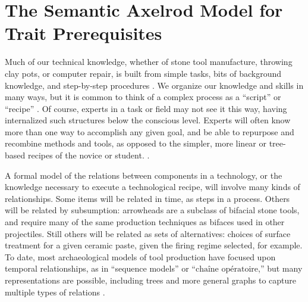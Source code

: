 \documentclass[referee,graybox,natbib]{svmult}
\begin{document}
\section{The Semantic Axelrod Model for Trait
Prerequisites}\label{the-semantic-axelrod-model-for-trait-prerequisites}

Much of our technical knowledge, whether of stone tool manufacture,
throwing clay pots, or computer repair, is built from simple tasks, bits
of background knowledge, and step-by-step procedures
\citep{neff1992ceramics, schiffer1987theory}. We organize our knowledge
and skills in many ways, but it is common to think of a complex process
as a ``script'' or ``recipe'' \citep{schank1977scripts}. Of course,
experts in a task or field may not see it this way, having internalized
such structures below the conscious level. Experts will often know more
than one way to accomplish any given goal, and be able to repurpose and
recombine methods and tools, as opposed to the simpler, more linear or
tree-based recipes of the novice or student.
\citep[e.g.,][]{Bleed:2008in, bleed2002obviously, stout2002skill}.

A formal model of the relations between components in a technology, or
the knowledge necessary to execute a technological recipe, will involve
many kinds of relationships. Some items will be related in time, as
steps in a process. Others will be related by subsumption: arrowheads
are a subclass of bifacial stone tools, and require many of the same
production techniques as bifaces used in other projectiles. Still others
will be related as sets of alternatives: choices of surface treatment
for a given ceramic paste, given the firing regime selected, for
example. To date, most archaeological models of tool production have
focused upon temporal relationships, as in ``sequence models'' or
``$\textrm{cha\^ine op\'eratoire}$,'' but many representations are
possible, including trees and more general graphs to capture multiple
types of relations
\citep{Bamforth:2008kq, Bleed:2008in, Ferguson:2008ce, Hogberg:2008fj, bleed2001trees, bleed2002obviously, schiffer1987theory, stout2002skill}.
\end{document}
